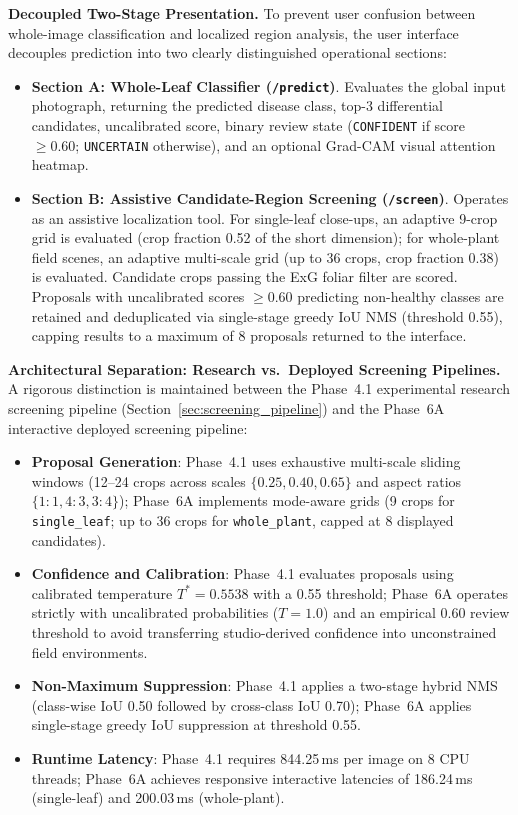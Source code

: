 \documentclass[pdflatex,sn-mathphys-num]{sn-jnl}
\theoremstyle{thmstyleone}%
\theoremstyle{thmstyletwo}%
\theoremstyle{thmstylethree}%
\begin{document}
\textbf{Decoupled Two-Stage Presentation.}
To prevent user confusion between whole-image classification and localized region analysis, the user interface decouples prediction into two clearly distinguished operational sections:
\begin{itemize}
  \item \textbf{Section A: Whole-Leaf Classifier (\texttt{/predict})}.
        Evaluates the global input photograph, returning the predicted disease class,
        top-3 differential candidates, uncalibrated score, binary review state
        (\texttt{CONFIDENT} if score $\ge 0.60$; \texttt{UNCERTAIN} otherwise),
        and an optional Grad-CAM visual attention heatmap.
  \item \textbf{Section B: Assistive Candidate-Region Screening (\texttt{/screen})}.
        Operates as an assistive localization tool. For single-leaf close-ups,
        an adaptive 9-crop grid is evaluated (crop fraction 0.52 of the short dimension);
        for whole-plant field scenes, an adaptive multi-scale grid (up to 36 crops,
        crop fraction 0.38) is evaluated. Candidate crops passing the ExG foliar filter
        are scored. Proposals with uncalibrated scores $\ge 0.60$ predicting non-healthy
        classes are retained and deduplicated via single-stage greedy IoU NMS (threshold 0.55),
        capping results to a maximum of 8 proposals returned to the interface.
\end{itemize}

\noindent\textbf{Architectural Separation: Research vs.\ Deployed Screening Pipelines.}
A rigorous distinction is maintained between the Phase~4.1 experimental research screening pipeline (Section~\ref{sec:screening_pipeline}) and the Phase~6A interactive deployed screening pipeline:
\begin{itemize}
  \item \textbf{Proposal Generation}: Phase~4.1 uses exhaustive multi-scale sliding windows (12--24 crops across scales $\{0.25, 0.40, 0.65\}$ and aspect ratios $\{1{:}1, 4{:}3, 3{:}4\}$); Phase~6A implements mode-aware grids (9 crops for \texttt{single\_leaf}; up to 36 crops for \texttt{whole\_plant}, capped at 8 displayed candidates).
  \item \textbf{Confidence and Calibration}: Phase~4.1 evaluates proposals using calibrated temperature $T^* = 0.5538$ with a 0.55 threshold; Phase~6A operates strictly with uncalibrated probabilities ($T = 1.0$) and an empirical 0.60 review threshold to avoid transferring studio-derived confidence into unconstrained field environments.
  \item \textbf{Non-Maximum Suppression}: Phase~4.1 applies a two-stage hybrid NMS (class-wise IoU 0.50 followed by cross-class IoU 0.70); Phase~6A applies single-stage greedy IoU suppression at threshold 0.55.
  \item \textbf{Runtime Latency}: Phase~4.1 requires 844.25\,ms per image on 8 CPU threads; Phase~6A achieves responsive interactive latencies of 186.24\,ms (single-leaf) and 200.03\,ms (whole-plant).
\end{itemize}
\end{document}
